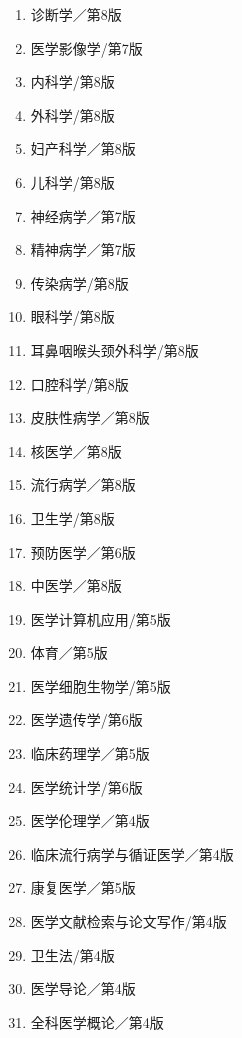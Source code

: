 \documentclass[10pt]{article}
\begin{document}
\begin{enumerate}
  \item 诊断学／第8版

  \item 医学影像学/第7版

  \item 内科学/第8版

  \item 外科学/第8版

  \item 妇产科学／第8版

  \item 儿科学/第8版

  \item 神经病学／第7版

  \item 精神病学／第7版

  \item 传染病学/第8版

  \item 眼科学/第8版

  \item 耳鼻咽㬋头颈外科学/第8版

  \item 口腔科学/第8版

  \item 皮肤性病学／第8版

  \item 核医学／第8版

  \item 流行病学／第8版

  \item 卫生学/第8版

  \item 预防医学／第6版

  \item 中医学／第8版

  \item 医学计算机应用/第5版

  \item 体育／第5版

  \item 医学细胞生物学/第5版

  \item 医学遗传学/第6版

  \item 临床药理学／第5版

  \item 医学统计学/第6版

  \item 医学伦理学／第4版

  \item 临床流行病学与循证医学／第4版

  \item 康复医学／第5版

  \item 医学文献检索与论文写作/第4版

  \item 卫生法/第4版

  \item 医学导论／第4版

  \item 全科医学概论／第4版

\end{enumerate}
\end{document}
